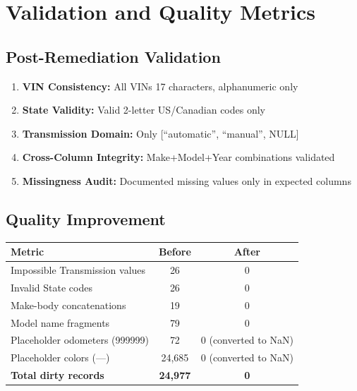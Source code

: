 \documentclass[12pt,a4paper]{article}
\begin{document}
\section{Validation and Quality Metrics}

\subsection{Post-Remediation Validation}

\begin{enumerate}
    \item \textbf{VIN Consistency:} All VINs 17 characters, alphanumeric only
    \item \textbf{State Validity:} Valid 2-letter US/Canadian codes only
    \item \textbf{Transmission Domain:} Only [``automatic'', ``manual'', NULL]
    \item \textbf{Cross-Column Integrity:} Make+Model+Year combinations validated
    \item \textbf{Missingness Audit:} Documented missing values only in expected columns
\end{enumerate}

\subsection{Quality Improvement}

\begin{center}
\begin{tabular}{lcc}
\toprule
\textbf{Metric} & \textbf{Before} & \textbf{After} \\
\midrule
Impossible Transmission values & 26 & 0 \\
Invalid State codes & 26 & 0 \\
Make-body concatenations & 19 & 0 \\
Model name fragments & 79 & 0 \\
Placeholder odometers (999999) & 72 & 0 (converted to NaN) \\
Placeholder colors (---) & 24,685 & 0 (converted to NaN) \\
\midrule
\textbf{Total dirty records} & \textbf{24,977} & \textbf{0} \\
\bottomrule
\end{tabular}
\end{center}
\end{document}
